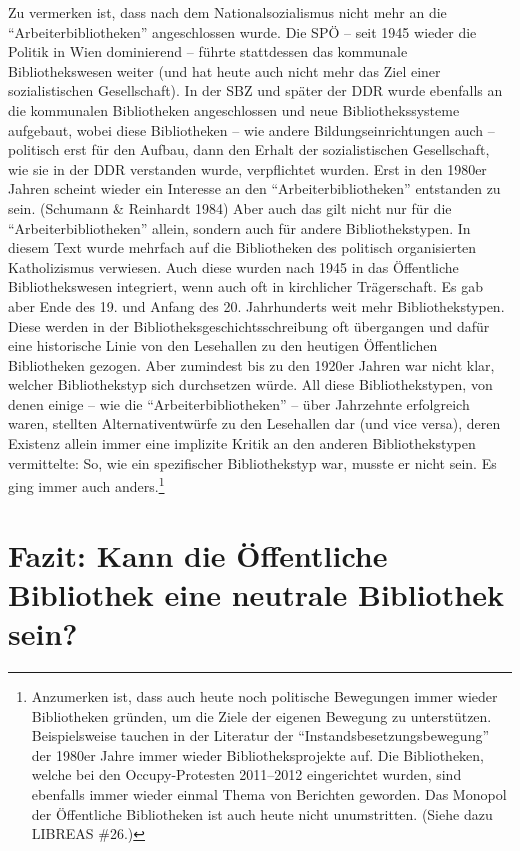 \documentclass[a4paper,
fontsize=11pt,
oneside,
numbers=noperiodatend,
parskip=half-,
bibliography=totoc,
final
]{scrartcl}
\begin{document}
Zu vermerken ist, dass nach dem Nationalsozialismus nicht mehr an die
\enquote{Arbeiterbibliotheken} angeschlossen wurde. Die SPÖ -- seit 1945
wieder die Politik in Wien dominierend -- führte stattdessen das
kommunale Bibliothekswesen weiter (und hat heute auch nicht mehr das
Ziel einer sozialistischen Gesellschaft). In der SBZ und später der DDR
wurde ebenfalls an die kommunalen Bibliotheken angeschlossen und neue
Bibliothekssysteme aufgebaut, wobei diese Bibliotheken -- wie andere
Bildungseinrichtungen auch -- politisch erst für den Aufbau, dann den
Erhalt der sozialistischen Gesellschaft, wie sie in der DDR verstanden
wurde, verpflichtet wurden. Erst in den 1980er Jahren scheint wieder ein
Interesse an den \enquote{Arbeiterbibliotheken} entstanden zu sein.
(Schumann \& Reinhardt 1984) Aber auch das gilt nicht nur für die
\enquote{Arbeiterbibliotheken} allein, sondern auch für andere
Bibliothekstypen. In diesem Text wurde mehrfach auf die Bibliotheken des
politisch organisierten Katholizismus verwiesen. Auch diese wurden nach
1945 in das Öffentliche Bibliothekswesen integriert, wenn auch oft in
kirchlicher Trägerschaft. Es gab aber Ende des 19. und Anfang des 20.
Jahrhunderts weit mehr Bibliothekstypen. Diese werden in der
Bibliotheksgeschichtsschreibung oft übergangen und dafür eine
historische Linie von den Lesehallen zu den heutigen Öffentlichen
Bibliotheken gezogen. Aber zumindest bis zu den 1920er Jahren war nicht
klar, welcher Bibliothekstyp sich durchsetzen würde. All diese
Bibliothekstypen, von denen einige -- wie die
\enquote{Arbeiterbibliotheken} -- über Jahrzehnte erfolgreich waren,
stellten Alternativentwürfe zu den Lesehallen dar (und vice versa),
deren Existenz allein immer eine implizite Kritik an den anderen
Bibliothekstypen vermittelte: So, wie ein spezifischer Bibliothekstyp
war, musste er nicht sein. Es ging immer auch anders.\footnote{Anzumerken
  ist, dass auch heute noch politische Bewegungen immer wieder
  Bibliotheken gründen, um die Ziele der eigenen Bewegung zu
  unterstützen. Beispielsweise tauchen in der Literatur der
  \enquote{Instandsbesetzungsbewegung} der 1980er Jahre immer wieder
  Bibliotheksprojekte auf. Die Bibliotheken, welche bei den
  Occupy-Protesten 2011--2012 eingerichtet wurden, sind ebenfalls immer
  wieder einmal Thema von Berichten geworden. Das Monopol der
  Öffentliche Bibliotheken ist auch heute nicht unumstritten. (Siehe
  dazu LIBREAS \#26.)}

\hypertarget{fazit-kann-die-uxf6ffentliche-bibliothek-eine-neutrale-bibliothek-sein}{%
\section*{Fazit: Kann die Öffentliche Bibliothek eine neutrale
Bibliothek
sein?}\label{fazit-kann-die-uxf6ffentliche-bibliothek-eine-neutrale-bibliothek-sein}}
\end{document}
